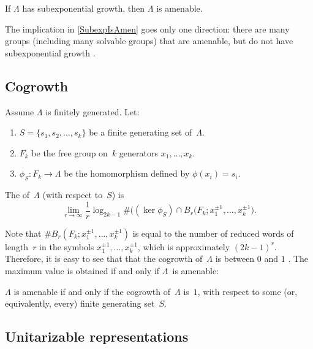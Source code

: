 \begin{prop} \label{SubexpIsAmen}
If $\Lambda$ has subexponential growth, then $\Lambda$ is amenable.
\end{prop}

\begin{warn}
The implication in \cref{SubexpIsAmen} goes only one direction: there are many groups (including many solvable groups) that are amenable, but do not have subexponential growth .
\end{warn}


\subsection{Cogrowth}

\begin{defn} \label{CoGrowthDefn}
Assume $\Lambda$ is finitely generated. Let:
	\begin{enumerate}
	\item  $S = \{s_1,s_2,\ldots,s_k\}$ be a finite generating set of~$\Lambda$.  
	\item  $F_k$ be the free group on~$k$ generators $x_1,\ldots,x_k$.
	\item  $\phi_S \colon F_k \to \Lambda$ be the homomorphism defined by $\phi(x_i) = s_i$.
	\end{enumerate}
The  of~$\Lambda$ (with respect to~$S$) is
	$$ \lim_{r \to \infty} \frac{1}{r} \log_{2k-1}  \# \bigl( (\ker \phi_S) \cap B_r(F_k; x_1^{\pm1},\ldots,x_k^{\pm1} \bigr) .$$
\end{defn}

Note that $\#B_r (F_k; x_1^{\pm1},\ldots,x_k^{\pm1})$ is equal to the number of reduced words of length~$r$ in the symbols $x_1^{\pm1},\ldots,x_k^{\pm1}$, which is approximately $(2k-1)^r$. Therefore, it is easy to see that that the cogrowth of~$\Lambda$ is between $0$ and $1$ . The maximum value is obtained if and only if $\Lambda$~is amenable:

\begin{thm} \label{AmenCoGrowth}
$\Lambda$ is amenable if and only if the cogrowth of~$\Lambda$ is~$1$, with respect to some\/ \textup(or, equivalently, every\/\textup) finite generating set~$S$.
\end{thm}


\subsection{Unitarizable representations}

